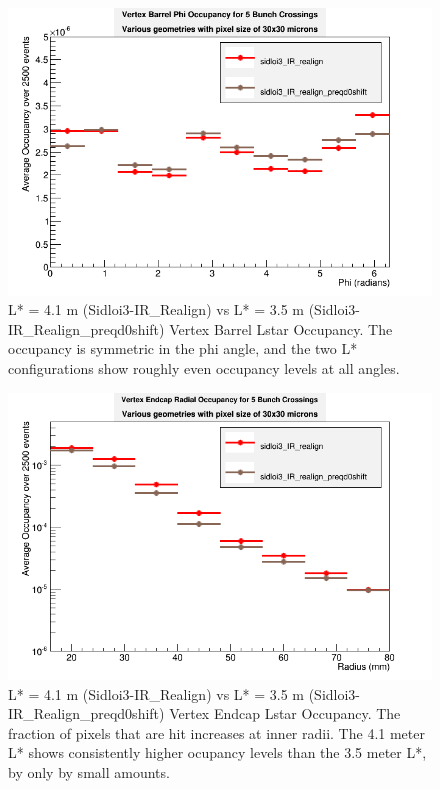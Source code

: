 \documentclass{report}
\begin{document}
                \begin{figure}[H] 
                    \includegraphics[height=.4\textheight]{VradOccupancy_Lstar_brl}
                    \centering
                    \caption{L* = 4.1 m (Sidloi3-IR\_Realign) vs L* = 3.5 m (Sidloi3-IR\_Realign\_preqd0shift) 
                                Vertex Barrel Lstar Occupancy. The occupancy is symmetric in the phi angle,
                                and the two L* configurations show roughly even occupancy levels at all angles.}
                    \label{fig__lstar_vertex_brl}
                \end{figure}
                \begin{figure}[H] 
                    \includegraphics[height=.4\textheight]{VradOccupancy_Lstar_ecp}
                    \centering
                    \caption{L* = 4.1 m (Sidloi3-IR\_Realign) vs L* = 3.5 m (Sidloi3-IR\_Realign\_preqd0shift) 
                                Vertex Endcap Lstar Occupancy. The fraction of pixels that are hit increases at inner radii.
                                The 4.1 meter L* shows consistently higher ocupancy levels than the 3.5 meter L*, by only by small amounts. }
                    \label{fig__lstar_vertex_ecp}
                \end{figure}
\end{document}
